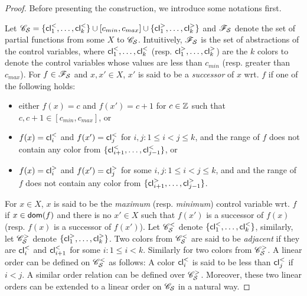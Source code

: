 \begin{appendix}
\begin{proof}
Before presenting the construction, we introduce some notations first.

Let $\mathscr{C}_{\mathcal{S} }=\{\mathsf{cl}^{<}_{1},\dots, \mathsf{cl}^{<}_{k}\} \cup [c_{min}, c_{max}] \cup \{\mathsf{cl}^{>}_{1},\dots, \mathsf{cl}^{>}_{k}\}$ and $\mathscr{F}_{\mathcal{S} }$ denote the set of partial functions from some $X$ to $\mathscr{C}_{\mathcal{S} }$. Intuitively, $\mathscr{F}_{\mathcal{S} }$ is the set of abstractions of the control variables, where $\mathsf{cl}^{<}_{1},\dots, \mathsf{cl}^{<}_{k}$ (resp. $\mathsf{cl}^{>}_{1},\dots, \mathsf{cl}^{>}_{k}$) are the $k$ colors to denote the control variables whose values are less than $c_{min}$ (resp. greater than $c_{max}$). For $f \in \mathscr{F}_{\mathcal{S} }$ and $x, x' \in X$, $x'$ is said to be a \emph{successor} of $x$ wrt. $f$ if one of the following holds: 
\begin{itemize}
\item either $f(x)=c$ and $f(x')=c+1$ for $c \in {\mathbb{Z} }$ such that $c, c+1 \in [c_{min},c_{max}]$, or

\item $f(x) = \mathsf{cl}^{<}_i$ and $f(x') = \mathsf{cl}^{<}_{j}$ for $i,j: 1 \le i < j \le k$, and the range of $f$ does not contain any color from $\{\mathsf{cl}^{<}_{i+1},\dots, \mathsf{cl}^{<}_{j-1}\}$, or

\item $f(x) = \mathsf{cl}^{>}_i$ and $f(x') = \mathsf{cl}^{>}_{j}$ for some $i,j: 1 \le i < j \le k$, and and the range of $f$ does not contain any color from $\{\mathsf{cl}^{>}_{i+1},\dots, \mathsf{cl}^{>}_{j-1}\}$. 
\end{itemize}
For $x \in X$, $x$ is said to be the \emph{maximum} (resp. \emph{minimum}) control variable wrt. $f$ if $x \in \mathsf{dom}(f)$ and there is no $x' \in X$ such that $f(x')$ is a successor of $f(x)$ (resp. $f(x)$ is a successor of $f(x')$). Let $\mathscr{C}^{<}_{\mathcal{S} }$ denote $\{\mathsf{cl}^{<}_{1},\dots, \mathsf{cl}^{<}_{k}\}$, similarly, let $\mathscr{C}^{>}_{\mathcal{S} }$ denote $\{\mathsf{cl}^{>}_{1},\dots, \mathsf{cl}^{>}_{k}\}$. Two colors from $\mathscr{C}^{<}_{\mathcal{S} }$ are said to be \emph{adjacent} if they are $\mathsf{cl}^{<}_i$ and $\mathsf{cl}^<_{i+1}$ for some $i: 1 \le i < k$. Similarly for two colors from $\mathscr{C}^>_{\mathcal{S} }$. A linear order can be defined on $\mathscr{C}^<_{\mathcal{S} }$ as follows: A color $\mathsf{cl}^<_i$ is said to be less than $\mathsf{cl}^<_j$ if $i<j$. A similar order relation can be defined over $\mathscr{C}^>_{\mathcal{S} }$. Moreover, these two linear orders can be extended to a linear order on $\mathscr{C}_{\mathcal{S} }$ in a natural way.


\end{proof}
\end{appendix}
